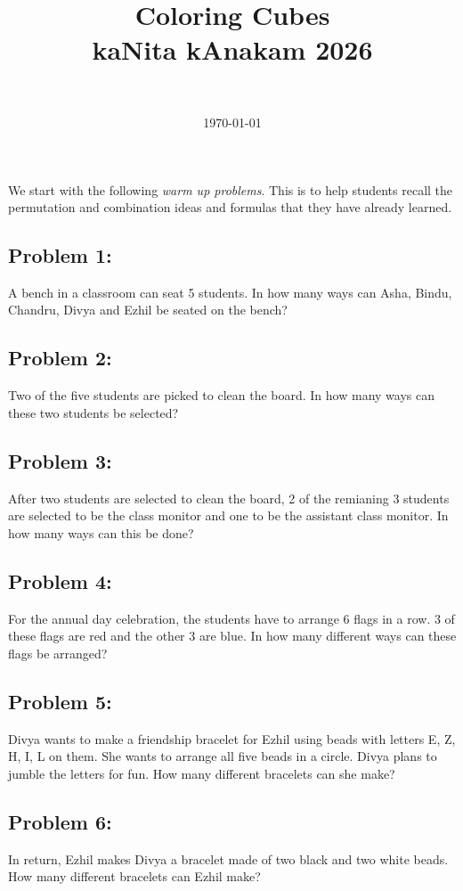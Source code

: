 \documentclass[12pt,a4paper]{program-proposal}
\title{Coloring Cubes\\{\normalsize kaNita kAnakam 2026}}
\author{~}
\date{\today}
\begin{document}
\maketitle
\thispagestyle{empty}
We start with the following \emph{warm up problems}. This is to help students recall the permutation and combination ideas and formulas that they have already learned. 

\subsection{Problem 1:} A bench in a classroom can seat 5 students. In how many ways can Asha, Bindu, Chandru, Divya and Ezhil be seated on the bench?

\subsection{Problem 2:} Two of the five students are picked to clean the board. In how many ways can these two students be selected?

\subsection{Problem 3:} After two students are selected to clean the board, 2 of the remianing 3 students are selected to be the class monitor and one to be the assistant class monitor. In how many ways can this be done?

\subsection{Problem 4:} For the annual day celebration, the students have to arrange 6 flags in a row. 3 of these flags are red and the other 3 are blue. In how many different ways can these flags be arranged?

\subsection{Problem 5:} Divya wants to make a friendship bracelet for Ezhil using beads with letters E, Z, H, I, L on them. She wants to arrange all five beads in a circle. Divya plans to jumble the letters for fun. How many different bracelets can she make?

\subsection{Problem 6:} In return, Ezhil makes Divya a bracelet made of two black and two white beads. How many different bracelets can Ezhil make?
\end{document}
